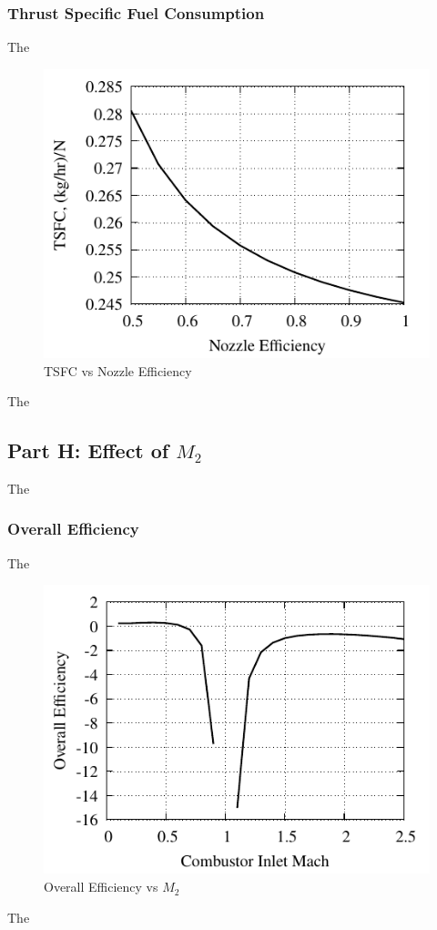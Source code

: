 \documentclass[conf]{new-aiaa} %
\begin{document}
\subsubsection{Thrust Specific Fuel Consumption}
The

\begin{figure}[hbt!]
\centering
\includegraphics[]{media/performance_parameter_files/part_g_TSFC.pdf}
\caption{\label{fig:partgtsfc} TSFC vs Nozzle Efficiency}
\end{figure}
The

\subsection{Part H: Effect of \texorpdfstring{\textit{$M_2$}}{M2}}
The

\subsubsection{Overall Efficiency}
The

\begin{figure}[hbt!]
\centering
\includegraphics[]{media/performance_parameter_files/part_h_eta_o.pdf}
\caption{\label{fig:parthetao} Overall Efficiency vs \texorpdfstring{\textit{$M_2$}}{M2}}
\end{figure}
The
\end{document}
